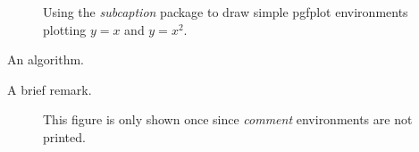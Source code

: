 \begin{figure}
    \centering
    \begin{subfigure}[b]{0.49\textwidth}
    \end{subfigure}
    \begin{subfigure}[b]{0.49\textwidth}
    \end{subfigure}
    \caption{Using the \emph{subcaption} package to draw simple pgfplot environments plotting $y=x$ and $y=x^2$.}
    \label{fig:pgfplot}
\end{figure}

\lipsum[22-23]

\begin{algorithm}[t]
 \SetAlgoLined
  \caption{An algorithm.} 
  \label{algo:algorithm}
\end{algorithm}

\lipsum[24-25]

\begin{remark}
    A brief remark.
\end{remark}

\lipsum[26-27]

\begin{comment}
    A comment block.
\end{comment}

\lipsum[28-29]

\begin{comment}
\begin{figure}[t]
    \centering
    
    \caption{A matrix $\mathbf{M}$.}
    \label{fig:matrix1}
\end{figure}
\end{comment}
\begin{figure}[t]
    \centering
    
    \caption{This figure is only shown once since \emph{comment} environments are not printed.}
    \label{fig:matrix2}
\end{figure}

